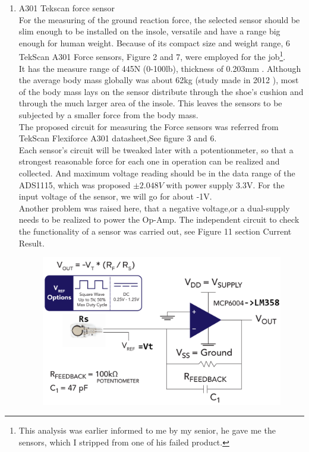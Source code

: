 \documentclass[12pt,a4paper]{article}
\begin{document}
\begin{enumerate}
  \item A301 Tekscan force sensor\\
For the measuring of the ground reaction force, the selected sensor should be slim enough to be installed on the insole, versatile and have a range big enough for human weight. Because of its compact size and weight range, 6 TekScan A301 Force sensors, Figure 2 and 7, were employed for the job\footnote{This analysis was earlier informed to me by my senior, he gave me the sensors, which I stripped from one of his failed product.}.\\
It has the measure range of 445N (0-100lb), thickness of 0.203mm \cite{A301}. Although the average body mass globally was about 62kg (study made in 2012 \cite{weight}), most of the body mass lays on the sensor distribute through the shoe's cushion and through the much larger area of the insole. This leaves the sensors to be subjected by a smaller force from the body mass.\\
The proposed circuit for measuring the Force sensors was referred from TekScan Flexiforce A301 datasheet\cite{A301},See figure 3 and 6.\\
Each sensor's circuit will be tweaked later with a potentionmeter, so that a strongest reasonable force for each one in operation can be realized and collected. And maximum voltage reading should be in the data range of the ADS1115, which was proposed $\pm2.048V$ with power supply 3.3V. For the input voltage of the sensor, we will go for about -1V.\\
Another problem was raised here, that a negative voltage,or a dual-supply needs to be realized to power the Op-Amp. The independent circuit to check the functionality of a sensor was carried out, see Figure 11 section Current Result. 
\begin{figure}[hbt!]
\begin{center}
\includegraphics[width = 170mm]{A301.png}

\end{center}
\end{figure}
\end{enumerate}
\end{document}

